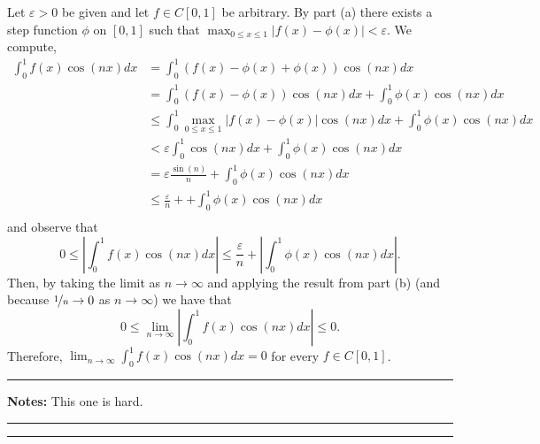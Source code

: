 \documentclass{article}
\begin{document}
Let $\varepsilon>0$ be given and let $f\in C[0,1]$ be arbitrary. By part (a) there exists a step function $\phi$ on $[0,1]$ such that $\max_{0\leq x\leq 1} |f(x) - \phi(x)| < \varepsilon$. We compute, 
	\begin{align*} 
		\int_0^1 f(x) \cos(nx) dx & =  \int_0^1 (f(x) - \phi(x) + \phi(x)) \cos(nx) dx \\
								      & =   \int_0^1 (f(x) - \phi(x))\cos(nx) dx + \int_0^1\phi(x) \cos(nx) dx\\
								      & \leq \int_0^1 \max_{0\leq x\leq 1} |f(x) - \phi(x)| \cos(nx) dx + \int_0^1\phi(x) \cos(nx) dx\\
								      & < \varepsilon \int_0^1 \cos(nx) dx +  \int_0^1\phi(x) \cos(nx) dx\\
								      & = \varepsilon \frac{\sin(n)}{n} + \int_0^1 \phi(x) \cos(nx) dx\\
								      & \leq \frac{\varepsilon}{n} + + \int_0^1 \phi(x) \cos(nx) dx\\
	\end{align*}
and observe that
	\[ 0 \leq \left| \int_0^1 f(x) \cos(nx) dx \right| \leq \frac{\varepsilon}{n} + \left | \int_0^1 \phi(x) \cos(nx) dx \right|.\]
Then, by taking the limit as $n\to \infty$ and applying the result from part (b) (and because $\nicefrac{1}{n} \to 0$ as $n\to \infty$) we have that 
	\[ 0 \leq \lim_{n\to\infty} \left| \int_0^1 f(x) \cos(nx) dx \right| \leq 0. \]
Therefore, $\lim_{n\to\infty} \int_0^1 f(x) \cos(nx) dx = 0$ for every $f\in C[0,1]$.	\\

\hrule 

\textbf{Notes:} This one is hard.\\

\hrule \vspace{2pt}
\hrule 		    
\end{document}
